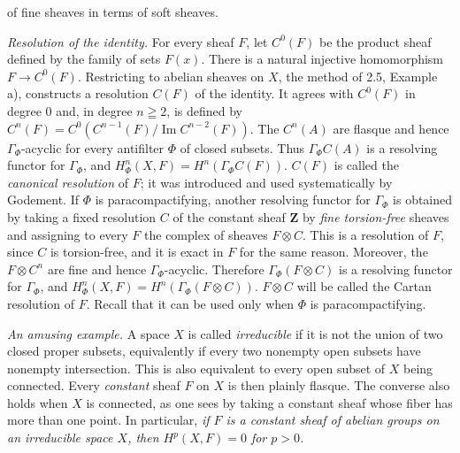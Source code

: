
\noindent of fine sheaves in terms of soft sheaves.

\textit{Resolution of the identity.} For every sheaf $F$, let $C^0(F)$ be the
product sheaf defined by the family of sets $F(x)$. There is a natural
injective homomorphism $F\to C^0(F)$. Restricting to abelian
sheaves on $X$, the method of 2.5, Example a), constructs a resolution
$C(F)$ of the identity. It agrees with $C^0(F)$ in degree 0 and, in degree
$n\geqq2$, is defined by
$C^n(F)=C^0(C^{n-1}(F)/\operatorname{Im}C^{n-2}(F))$.
The $C^n(A)$ are flasque and hence $\Gamma_\Phi$-acyclic for every antifilter
$\Phi$ of closed subsets. Thus $\Gamma_\Phi C(A)$ is a resolving functor for
$\Gamma_\Phi$, and
$H^n_\Phi(X,F)=H^n(\Gamma_\Phi C(F))$.
$C(F)$ is called the \textit{canonical resolution} of $F$; it was introduced
and used systematically by Godement.
If $\Phi$ is paracompactifying, another resolving functor for $\Gamma_\Phi$
is obtained by taking a fixed resolution $C$ of the constant sheaf
$\mathbf Z$ by \textit{fine torsion-free} sheaves and assigning to every $F$ the
complex of sheaves $F\otimes C$. This is a resolution of $F$, since $C$ is
torsion-free, and it is exact in $F$ for the same reason. Moreover, the
$F\otimes C^n$ are fine and hence $\Gamma_\Phi$-acyclic. Therefore
$\Gamma_\Phi(F\otimes C)$ is a resolving functor for $\Gamma_\Phi$, and
$H^n_\Phi(X,F)=H^n(\Gamma_\Phi(F\otimes C))$.
$F\otimes C$ will be called the Cartan resolution of $F$. Recall that it can
be used only when $\Phi$ is paracompactifying.

\textit{An amusing example.} A space $X$ is called \textit{irreducible} if it
is not the union of two closed proper subsets, equivalently if every two
nonempty open subsets have nonempty intersection. This is also equivalent to
every open subset of $X$ being connected. Every \textit{constant} sheaf $F$
on $X$ is then plainly flasque. The converse also holds when $X$ is connected,
as one sees by taking a constant sheaf whose fiber has more than one point.
In particular, \textit{if $F$ is a constant sheaf of abelian groups on an
irreducible space $X$, then $H^p(X,F)=0$ for $p>0$.}

